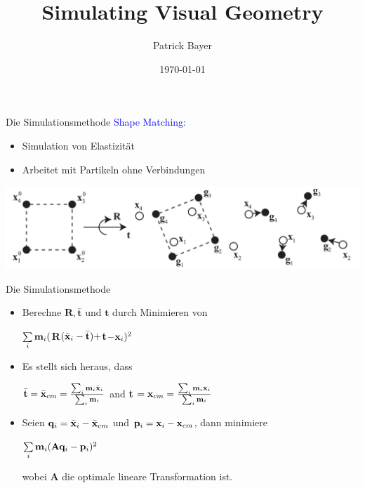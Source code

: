 \documentclass[t]{beamer}
\date{\today}
\title{Simulating Visual Geometry}
\author{Patrick Bayer}
\begin{document}
	\begin{frame}{Die Simulationsmethode}
	\textcolor{blue}{Shape Matching:}
	\begin{itemize}
		\item Simulation von Elastizität
		\item Arbeitet mit Partikeln ohne Verbindungen
	\end{itemize}
	\begin{center}
		\includegraphics[scale = 0.25]{ShapeMatching.png}
	\end{center}
	
\end{frame}


\begin{frame}{Die Simulationsmethode}
	\begin{itemize}
		\item Berechne $\mathbf{R}, \mathbf{\bar{t}}$ und $ \mathbf{t}$ durch Minimieren von \\
		\begin{center}
			$\sum\limits_{\mathnormal{i}}\mathnormal{\mathbf{m}_i}($\textbf{R}$(\mathnormal{\mathbf{\bar{x}}_i}-\mathnormal{\mathbf{\bar{t}}})+$\textbf{t}$-\mathnormal{\mathbf{x}_i})^2$
		\end{center}
		\item Es stellt sich heraus, dass \\
		\begin{center}
			$\mathnormal{\mathbf{\bar{t}}}=\mathnormal{\mathbf{\bar{x}}_{cm}}=\frac{\sum_{\mathnormal{i}}\mathnormal{\mathbf{m}_i} \mathnormal{\mathbf{\bar{x}}_i}}{\sum_{\mathnormal{i}}\mathnormal{\mathbf{m}_i}}$ and \textbf{t} $=\mathnormal{\mathbf{x}_{cm}}=\frac{\sum_{\mathnormal{i}}\mathnormal{\mathbf{m}_i \mathbf{x}_i}}{\sum_{\mathnormal{i}}\mathnormal{\mathbf{m}_i}}$
		\end{center}
		\item Seien $\mathnormal{\mathbf{q}_i}=\mathnormal{\mathbf{\bar{x}}_i}-\mathnormal{\mathbf{\bar{x}}_{cm}}$ und
		$\mathnormal{\mathbf{p}_i}=\mathnormal{\mathbf{x}_i}-\mathnormal{\mathbf{x}_{cm}}$, dann minimiere \\
		\begin{center}
			$\sum\limits_{\mathnormal{i}}\mathnormal{\mathbf{m}_i}(\mathnormal{\mathbf{A}\mathbf{q}_i}-\mathnormal{\mathbf{p}_i})^2$
		\end{center}
		wobei \textbf{A} die optimale lineare Transformation ist.	
		
	\end{itemize}
\end{frame}
\end{document}
